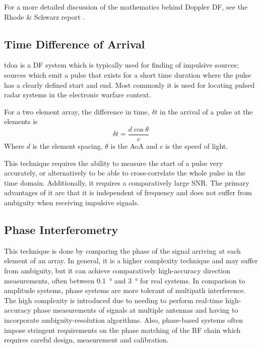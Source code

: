 For a more detailed discussion of the mathematics behind Doppler DF, see the Rhode \& Schwarz report \cite{rhode2000introtodf}. 

\subsection{Time Difference of Arrival}
\gls{tdoa} is a DF system which is typically used for finding of impulsive sources; sources which emit a pulse that exists for a short time duration where the pulse has a clearly defined start and end. Most commonly it is used for locating pulsed radar systems in the electronic warfare context.

For a two element array, the difference in time, \(\delta t\) in the arrival of a pulse at the elements is
\begin{equation}
  \delta t = \frac{d \cos \theta}{c}
\end{equation}
Where \(d\) is the element spacing, \(\theta\) is the AoA and \(c\) is the speed of light.

This technique requires the ability to measure the start of a pulse very accurately, or alternatively to be able to cross-correlate the whole pulse in the time domain. Additionally, it requires a comparatively large SNR. The primary advantages of it are that it is independent of frequency and does not suffer from ambiguity when receiving impulsive signals\cite{jenkins1991smallaperture}.

\subsection{Phase Interferometry}
This technique is done by comparing the phase of the signal arriving at each element of an array.
In general, it is a higher complexity technique and may suffer from ambiguity, but it can achieve comparatively high-accuracy direction measurements, often between \SI{0.1}{\degree} and \SI{3}{\degree} for real systems\cite{center2012electronic}.
In comparison to amplitude systems, phase systems are more tolerant of multipath interference. 
The high complexity is introduced due to needing to perform real-time high-accuracy phase measurements of signals at multiple antennas and having to incorporate ambiguity-resolution algorithms.
Also, phase-based systems often impose stringent requirements on the phase matching of the RF chain which requires careful design, measurement and calibration\cite{schleher1999electronic}.

